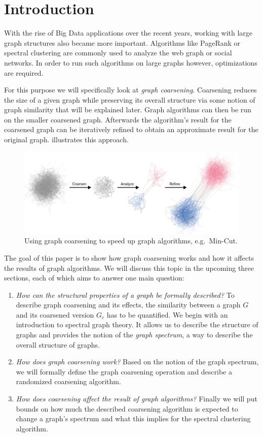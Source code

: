 \section{Introduction}%
\label{sec:intro}

\setcounter{page}{1}			%

With the rise of Big Data applications over the recent years, working with large graph structures also became more important.
Algorithms like PageRank or spectral clustering are commonly used to analyze the web graph or social networks.
In order to run such algorithms on large graphs however, optimizations are required.

For this purpose we will specifically look at \textit{graph coarsening}.
Coarsening reduces the size of a given graph while preserving its overall structure via some notion of graph similarity that will be explained later.
Graph algorithms can then be run on the smaller coarsened graph.
Afterwards the algorithm's result for the coarsened graph can be iteratively refined to obtain an approximate result for the original graph.
 illustrates this approach.
\begin{figure}[ht]
	\centering
	\includegraphics[width=0.8\linewidth]{gfx/intro/overview.pdf}
	\caption{%
		Using graph coarsening to speed up graph algorithms, e.g.\  Min-Cut.
	}\label{fig:intro:overview}
\end{figure}

The goal of this paper is to show how graph coarsening works and how it affects the results of graph algorithms.
We will discuss this topic in the upcoming three sections, each of which aims to answer one main question:
\begin{enumerate}
	\item \textit{How can the structural properties of a graph be formally described?}
		To describe graph coarsening and its effects, the similarity between a graph $G$ and its coarsened version $G_c$ has to be quantified.
		We begin with an introduction to spectral graph theory.
		It allows us to describe the structure of graphs and provides the notion of the \textit{graph spectrum}, a way to describe the overall structure of graphs.
	\item \textit{How does graph coarsening work?}
		Based on the notion of the graph spectrum, we will formally define the graph coarsening operation and describe a randomized coarsening algorithm.
	\item \textit{How does coarsening affect the result of graph algorithms?}
		Finally we will put bounds on how much the described coarsening algorithm is expected to change a graph's spectrum and what this implies for the spectral clustering algorithm.
\end{enumerate}
